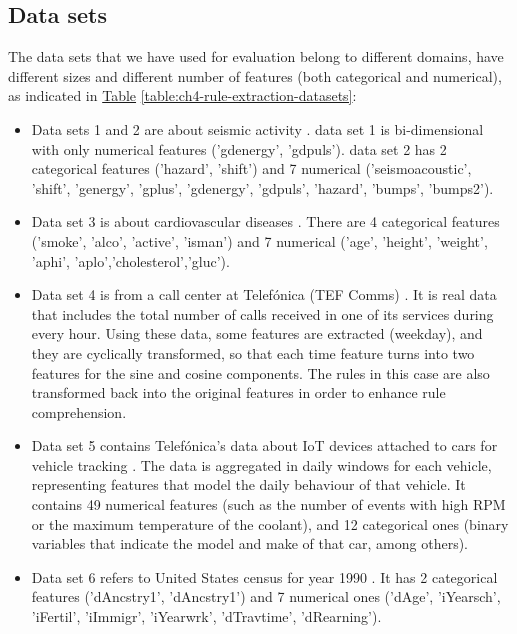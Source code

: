 \subsection{Data sets}\label{subsec:RuleExtractionDataSets}
The data sets that we have used for evaluation belong to different domains, have different sizes and different number of features (both categorical and numerical), as indicated in \hyperref[table:ch4-rule-extraction-datasets]{Table} \ref{table:ch4-rule-extraction-datasets}:
\begin{itemize}
    \item Data sets 1 and 2 are about seismic activity \parencite{sathe2016lodes}. data set 1 is bi-dimensional with only numerical features ('gdenergy', 'gdpuls'). data set 2 has 2 categorical features ('hazard', 'shift') and 7 numerical ('seismoacoustic', 'shift', 'genergy', 'gplus', 'gdenergy', 'gdpuls', 'hazard', 'bumps', 'bumps2').
    \item Data set 3 is about cardiovascular diseases \parencite{padmanabhan2019physician}. There are 4 categorical features ('smoke', 'alco', 'active', 'is\textunderscore man') and 7 numerical ('age', 'height', 'weight', 'ap\textunderscore hi', 'ap\textunderscore lo','cholesterol','gluc').
    \item Data set 4 is from a call center at Telefónica (TEF Comms) \parencite{patent2019comms}. It is real data that includes the total number of calls received in one of its services during every hour. Using these data, some features are extracted (weekday), and they are cyclically transformed, so that each time feature turns into two features for the sine and cosine components. The rules in this case are also transformed back into the original features in order to enhance rule comprehension. 
    \item Data set 5 contains Telefónica's data about IoT devices attached to cars for vehicle tracking \parencite{patent2020fleet}. The data is aggregated in daily windows for each vehicle, representing features that model the daily behaviour of that vehicle. It contains 49 numerical features (such as the number of events with high RPM or the maximum temperature of the coolant), and 12 categorical ones (binary variables that indicate the model and make of that car, among others).
    \item Data set 6 refers to United States census for year 1990 \parencite{blake1998uci}. It has 2 categorical features ('dAncstry1', 'dAncstry1') and 7 numerical ones ('dAge', 'iYearsch', 'iFertil', 'iImmigr', 'iYearwrk', 'dTravtime', 'dRearning').
\end{itemize}

